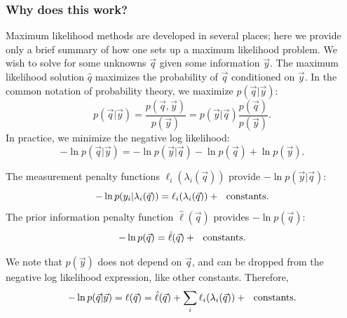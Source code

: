 \documentclass{article}    %
\begin{document}
\subsubsection{Why does this work?}

Maximum likelihood methods are developed in several places; here we
provide only a brief summary of how one sets up a maximum likelihood
problem. We wish to solve for some unknowns $\vec{q}$ given some
information $\vec{y}$. The maximum likelihood solution $\hat{q}$
maximizes the probability of $\vec{q}$ conditioned on $\vec{y}$. In
the common notation of probability theory, we maximize $p(\vec{q}|\vec{y})$:
\begin{equation}
p(\vec{q}|\vec{y}) = \frac{p(\vec{q},\vec{y})}{p(\vec{y})} = p(\vec{y}|\vec{q})\frac{p(\vec{q})}{p(\vec{y})}.
\end{equation}
In practice, we minimize the negative log likelihood:
\begin{equation}
-\ln p(\vec{q}|\vec{y}) = -\ln p(\vec{y}|\vec{q}) - \ln p(\vec{q}) + \ln p(\vec{y}).
\end{equation}

The measurement penalty functions $\ell_i(\lambda_i(\vec{q}))$ provide $-\ln p(\vec{y}|\vec{q})$:
\begin{equation}
-\ln p(y_i|\lambda_i(\vec{q})) = \ell_i(\lambda_i(\vec{q})) + {\rm ~~ constants}.
\end{equation}
The prior information penalty function $\hat{\ell}(\vec{q})$ provides $-\ln p(\vec{q})$:
\begin{equation}
-\ln p(\vec{q}) = \hat{\ell}(\vec{q}) + {\rm ~~ constants}.
\end{equation}

We note that $p(\vec{y})$ does not depend on $\vec{q}$, and can be dropped from
the negative log likelihood expression, like other constants. Therefore,
\begin{equation}
-\ln p(\vec{q}|\vec{y}) = \ell(\vec{q}) = \hat{\ell}(\vec{q}) + \sum_i \ell_i(\lambda_i(\vec{q})) + {\rm ~~ constants}.
\end{equation}
\end{document}
